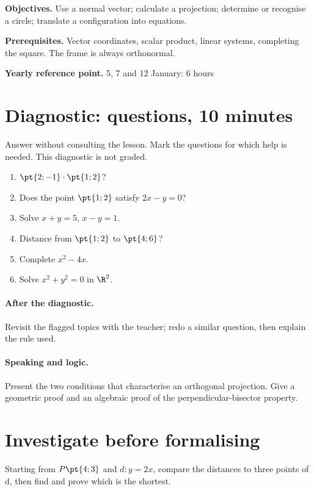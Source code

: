 \label{C07}
\begin{keypoint}
\textbf{Objectives.} Use a normal vector; calculate a projection; determine or recognise a circle; translate a configuration into equations.

\textbf{Prerequisites.} Vector coordinates, scalar product, linear systems, completing the square. The frame is always orthonormal.

\textbf{Yearly reference point.} 5, 7 and 12 January: 6 hours\end{keypoint}
\section*{Diagnostic:  questions, 10 minutes}\label{C07-D}
Answer without consulting the lesson. Mark the questions for which help is needed. This diagnostic is not graded.
\begin{enumerate}
\item $\pt{2;-1}\cdot\pt{1;2}$?
\item Does the point $\pt{1;2}$ satisfy $2x-y=0$?
\item Solve $x+y=5$, $x-y=1$.
\item Distance from $\pt{1;2}$ to $\pt{4;6}$?
\item Complete $x^2-4x$.
\item Solve $x^2+y^2=0$ in $\R^2$.
\end{enumerate}
\paragraph{After the diagnostic.} Revisit the flagged topics with the teacher; redo a similar question, then explain the rule used.
\paragraph{Speaking and logic.} Present the two conditions that characterise an orthogonal projection. Give a geometric proof and an algebraic proof of the perpendicular-bisector property.
\mxnewpage
\section*{Investigate before formalising}\label{C07-RECH}
Starting from $P\pt{4;3}$ and $d:y=2x$, compare the distances to three points of d, then find and prove which is the shortest.
